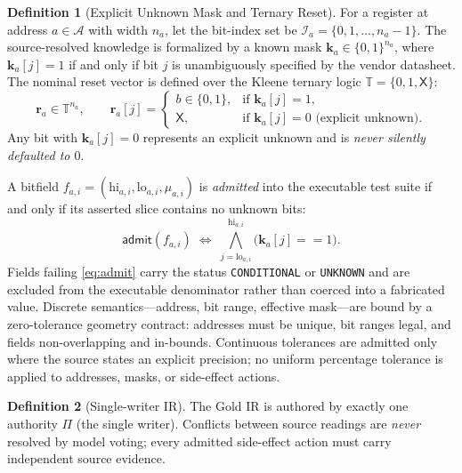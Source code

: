 \documentclass[preprint,review]{elsarticle}
\theoremstyle{definition}
\newtheorem{definition}{Definition}[section]
\begin{document}
\begin{definition}[Explicit Unknown Mask and Ternary Reset]
For a register at address $a \in \mathcal{A}$ with width $n_a$, let the bit-index set be $\mathcal{I}_a = \{0, 1, \dots, n_a-1\}$. The source-resolved knowledge is formalized by a known mask $\mathbf{k}_a \in \{0,1\}^{n_a}$, where $\mathbf{k}_a[j]=1$ if and only if bit $j$ is unambiguously specified by the vendor datasheet. 
The nominal reset vector is defined over the Kleene ternary logic $\mathbb{T} = \{0, 1, \mathsf{X}\}$:
\begin{equation}
\mathbf{r}_a \in \mathbb{T}^{n_a}, \qquad 
\mathbf{r}_a[j] = \begin{cases} 
b \in \{0, 1\}, & \text{if } \mathbf{k}_a[j] = 1, \\ 
\mathsf{X}, & \text{if } \mathbf{k}_a[j] = 0 \text{ (explicit unknown)}.
\end{cases}
\label{eq:ternary-reset}
\end{equation}
Any bit with $\mathbf{k}_a[j]=0$ represents an explicit unknown and is \emph{never silently defaulted to $0$}.
\end{definition}

A bitfield $f_{a,i} = (\mathrm{hi}_{a,i}, \mathrm{lo}_{a,i}, \mu_{a,i})$ is \emph{admitted} into the executable test suite if and only if its asserted slice contains no unknown bits:
\begin{equation}
\mathsf{admit}(f_{a,i}) \;\iff\; \bigwedge_{j=\mathrm{lo}_{a,i}}^{\mathrm{hi}_{a,i}} \bigl(\mathbf{k}_a[j] == 1\bigr).
\label{eq:admit}
\end{equation}
Fields failing \eqref{eq:admit} carry the status \texttt{CONDITIONAL} or
\texttt{UNKNOWN} and are excluded from the executable denominator rather than coerced into
a fabricated value. Discrete semantics---address, bit range, effective mask---are bound by a
zero-tolerance geometry contract: addresses must be unique, bit ranges legal, and fields
non-overlapping and in-bounds. Continuous tolerances are admitted only where the source
states an explicit precision; no uniform percentage tolerance is applied to addresses,
masks, or side-effect actions.

\begin{definition}[Single-writer IR]
The Gold IR is authored by exactly one authority $\Pi$ (the single writer). Conflicts
between source readings are \emph{never} resolved by model voting; every admitted
side-effect action must carry independent source evidence.
\end{definition}
\end{document}
